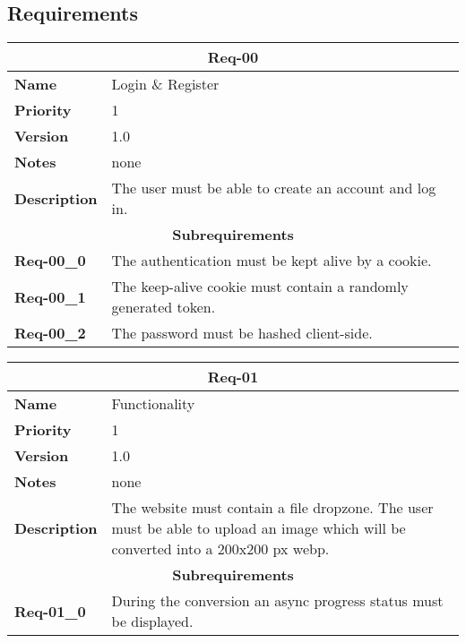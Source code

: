 \documentclass[../documentation.tex]{subfiles}
\begin{document}
\subsection{Requirements}

\bgroup{}
\def\arraystretch{1.25}
\begin{center}
    \begin{tabular}{ |l|p{9cm}| }
        \hline
        \multicolumn{2}{|c|}{\textbf{Req-00}} \\
        \hline
        \textbf{Name} & Login \& Register \\
        \hline
        \textbf{Priority} & 1 \\
        \hline
        \textbf{Version} & 1.0 \\
        \hline
        \textbf{Notes} & none \\
        \hline
        \textbf{Description} & The user must be able to create an account and log in. \\
        \hline
        \multicolumn{2}{|c|}{\textbf{Subrequirements}} \\
        \hline
        \textbf{Req-00\_0} & The authentication must be kept alive by a cookie. \\
        \textbf{Req-00\_1} & The keep-alive cookie must contain a randomly generated token. \\
        \textbf{Req-00\_2} & The password must be hashed client-side. \\
        \hline
    \end{tabular}
\end{center}
\egroup{}

\bgroup{}
\def\arraystretch{1.25}
\begin{center}
    \begin{tabular}{ |l|p{9cm}| }
        \hline
        \multicolumn{2}{|c|}{\textbf{Req-01}} \\
        \hline
        \textbf{Name} & Functionality \\
        \hline
        \textbf{Priority} & 1 \\
        \hline
        \textbf{Version} & 1.0 \\
        \hline
        \textbf{Notes} & none \\
        \hline
        \textbf{Description} & The website must contain a file dropzone. The user must be able to upload an image which will be converted into a 200x200 px webp. \\
        \hline
        \multicolumn{2}{|c|}{\textbf{Subrequirements}} \\
        \hline
        \textbf{Req-01\_0} & During the conversion an async progress status must be displayed. \\
        \hline
    \end{tabular}
\end{center}
\egroup{}
\end{document}
